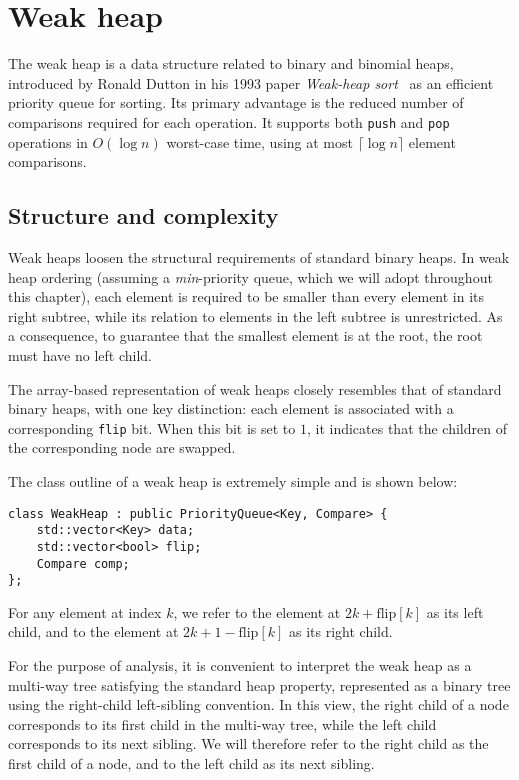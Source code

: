 \section{Weak heap}

The weak heap is a data structure related to binary and binomial heaps, introduced by Ronald Dutton in his 1993 paper \emph{Weak-heap sort}~\cite{Dutton1993} as an efficient priority queue for
sorting. Its primary advantage is the reduced number of comparisons required for each operation. It supports both \texttt{push} and \texttt{pop} operations in \( O(\log n) \) worst-case time, using at most \( \lceil \log n \rceil \) element comparisons.

\subsection{Structure and complexity}

Weak heaps loosen the structural requirements of standard binary heaps. In weak heap ordering (assuming a \emph{min}-priority queue, which we will adopt throughout this chapter), each element is required to be smaller than every element in its right subtree, while its relation to elements in the left subtree is unrestricted. As a consequence, to guarantee that the smallest element is at the root, the root must have no left child.

The array-based representation of weak heaps closely resembles that of standard binary heaps, with one key distinction: each element is associated with a corresponding \texttt{flip} bit. When this bit is set to \(1\), it indicates that the children of the corresponding node are swapped.

The class outline of a weak heap is extremely simple and is shown below:

\begin{verbatim}
class WeakHeap : public PriorityQueue<Key, Compare> {
    std::vector<Key> data;
    std::vector<bool> flip;
    Compare comp;
};
\end{verbatim}

For any element at index \(k\), we refer to the element at \(2k + \text{flip}[k]\) as its left child, and to the element at \(2k + 1 - \text{flip}[k]\) as its right child. 

For the purpose of analysis, it is convenient to interpret the weak heap as a multi-way tree satisfying the standard heap property, represented as a binary tree using the right-child left-sibling convention. In this view, the right child of a node corresponds to its first child in the multi-way tree, while the left child corresponds to its next sibling. We will therefore refer to the right child as the first child of a node, and to the left child as its next sibling.

